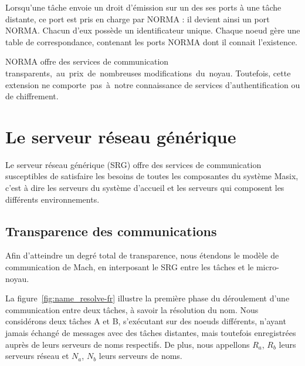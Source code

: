 Lorsqu'une t\^ache envoie un droit d'\'emission sur un des ses ports \`a une t\^ache distante, ce port est pris en charge par NORMA : il devient ainsi un port 
NORMA. Chacun d'eux poss\`ede un identificateur unique. Chaque 
noeud g\`ere une table de correspondance, contenant les ports NORMA 
dont il connait l'existence. 

NORMA offre des services de communication transpa\-rents,~au~prix~de~nombreuses modifications~du~noyau. Toutefois, cette extension ne comporte~pas~\`a~notre
 con\-naissance de services d'authentification ou de chiffrement.

\section {Le serveur r\'eseau g\'en\'erique}

Le serveur r\'eseau g\'en\'erique (SRG) offre des services de communication susceptibles de satisfaire les besoins de toutes les composantes du syst\`eme 
Masix, c'est \`a dire les serveurs du syst\`eme d'accueil et les 
serveurs qui composent les diff\'erents environnements. 

\subsection{Transparence des communications}

Afin d'atteindre un degr\'e total de transparence, nous \'etendons le mod\`ele
de communication de Mach, en interposant le SRG entre les t\^aches et le
micro-noyau.

La figure~\ref{fig:name_resolve-fr} illustre la premi\`ere phase du d\'eroulement d'une communication entre deux t\^aches, \`a savoir la r\'esolution du nom. Nous consid\'erons deux t\^aches A et B, s'ex\'ecutant sur des noeuds diff\'erents, n'ayant jamais \'echang\'e de messages avec des t\^aches distantes, mais toutefois enregistr\'ees aupr\`es de leurs serveurs de noms respectifs. De plus, nous appellons \(R_{a}\), \(R_{b}\) leurs serveurs r\'eseau et \(N_{a}\), \(N_{b}\) leurs serveurs de noms.


